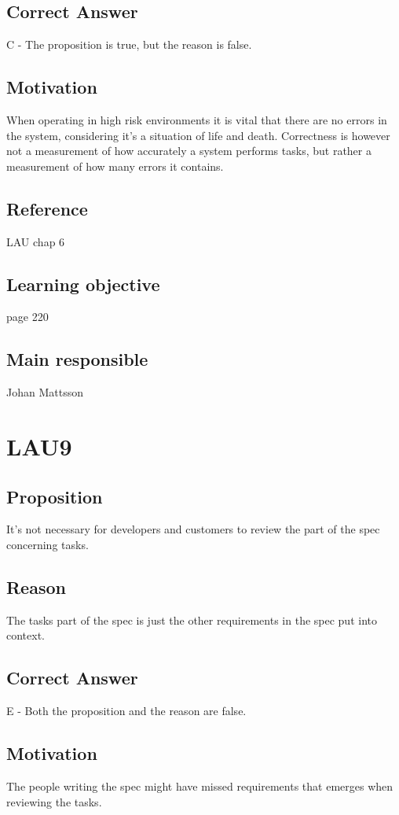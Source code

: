 \documentclass[a4paper]{article}
\begin{document}
\subsection*{Correct Answer}
C - The proposition is true, but the reason is false.
\subsection*{Motivation}
When operating in high risk environments it is vital that there are no errors in the system, considering it’s a situation of life and death. Correctness is however not a measurement of how accurately a system performs tasks, but rather a measurement of how many errors it contains.
\subsection*{Reference}
LAU chap 6
\subsection*{Learning objective}
page 220
\subsection*{Main responsible}
Johan Mattsson

\section{LAU9}
\subsection*{Proposition}
It’s not necessary for developers and customers to review the part of the spec concerning tasks.
\subsection*{Reason}
The tasks part of the spec is just the other requirements in the spec put into context.
\subsection*{Correct Answer}
E - Both the proposition and the reason are false.
\subsection*{Motivation}
The people writing the spec might have missed requirements that emerges when reviewing the tasks.
\end{document}
